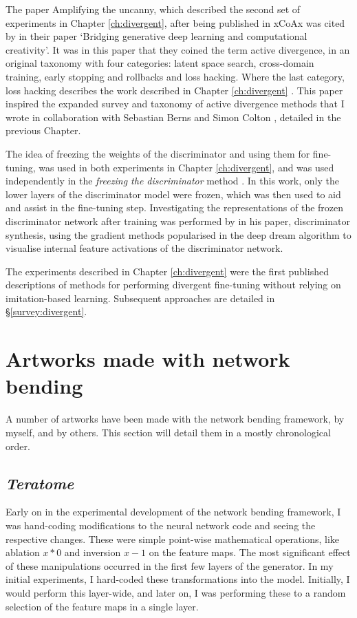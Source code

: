 The paper Amplifying the uncanny, which described the second set of experiments in Chapter \ref{ch:divergent}, after being published in xCoAx was cited by \cite{berns2020bridging} in their paper ‘Bridging generative deep learning and computational creativity’. 
It was in this paper that they coined the term active divergence, in an original taxonomy with four categories: latent space search, cross-domain training, early stopping and rollbacks and loss hacking. 
Where the last category, loss hacking describes the work described in Chapter \ref{ch:divergent} . 
This paper inspired the expanded survey and taxonomy of active divergence methods that I wrote in collaboration with Sebastian Berns and Simon Colton \citep{broad2021active}, detailed in the previous Chapter.

The idea of freezing the weights of the discriminator and using them for fine-tuning, was used in both experiments in Chapter \ref{ch:divergent}, and was used independently in the \textit{freezing the discriminator} method \citep{mo2020freeze}. In this work, only the lower layers of the discriminator model were frozen, which was then used to aid and assist in the fine-tuning step.
Investigating the representations of the frozen discriminator network after training was performed by \citet{porres2021discriminator} in his paper, discriminator synthesis, using the gradient methods popularised in the deep dream algorithm to visualise internal feature activations of the discriminator network.

The experiments described in Chapter \ref{ch:divergent} were the first published descriptions of methods for performing divergent fine-tuning without relying on imitation-based learning. 
Subsequent approaches are detailed in \S \ref{survey:divergent}.

\section{Artworks made with network bending}
\label{c7:sec:net-bend-artworks}

A number of artworks have been made with the network bending framework, by myself, and by others. 
This section will detail them in a mostly chronological order.

\subsection{\textit{Teratome}}
\label{c7:subsubsec:teratome}

Early on in the experimental development of the network bending framework, I was hand-coding modifications to the neural network code and seeing the respective changes. 
These were simple point-wise mathematical operations, like ablation $x*0$ and inversion $x-1$ on the feature maps. 
The most significant effect of these manipulations occurred in the first few layers of the generator. 
In my initial experiments, I hard-coded these transformations into the model. Initially, I would perform this layer-wide, and later on, I was performing these to a random selection of the feature maps in a single layer. 

